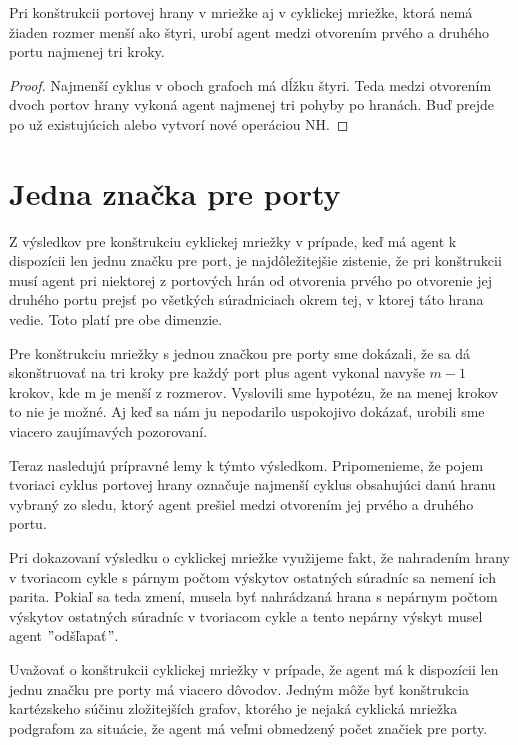 \begin{lem}
Pri konštrukcii portovej hrany v mriežke aj v cyklickej mriežke, ktorá
nemá žiaden rozmer menší ako štyri, 
urobí agent medzi otvorením prvého a druhého
portu najmenej tri kroky.
\end{lem}
\begin{proof}
Najmenší cyklus v oboch grafoch má dĺžku štyri. 
Teda medzi otvorením dvoch portov
hrany vykoná agent najmenej tri pohyby po hranách. Buď prejde po už
existujúcich alebo vytvorí nové operáciou NH.
\end{proof}

\section{Jedna značka pre porty}

Z výsledkov pre konštrukciu cyklickej mriežky v prípade, keď má agent k
dispozícii len jednu značku pre port, je najdôležitejšie zistenie, že pri
konštrukcii musí agent pri niektorej z portových hrán od otvorenia prvého po
otvorenie jej druhého portu prejsť po všetkých súradniciach okrem tej, v
ktorej táto hrana vedie. Toto platí pre obe dimenzie.

Pre konštrukciu mriežky s jednou značkou pre porty sme dokázali, že sa dá
skonštruovať na tri kroky pre každý port plus agent vykonal navyše $m-1$
krokov, kde m je menší z rozmerov. Vyslovili sme hypotézu, že na menej
krokov to nie je možné. Aj keď sa nám ju nepodarilo uspokojivo dokázať,
urobili sme viacero zaujímavých pozorovaní.

Teraz nasledujú prípravné lemy k týmto výsledkom. Pripomenieme, že pojem
tvoriaci cyklus portovej hrany označuje najmenší cyklus obsahujúci danú hranu
vybraný zo sledu, ktorý agent prešiel medzi otvorením jej prvého a druhého
portu.

Pri dokazovaní výsledku o cyklickej mriežke využijeme fakt, že nahradením
hrany v tvoriacom cykle s párnym počtom výskytov ostatných súradníc sa nemení 
ich parita. Pokiaľ sa teda zmení, musela byť nahrádzaná hrana s nepárnym
počtom výskytov ostatných súradníc v tvoriacom cykle a tento nepárny výskyt
musel agent $"$odšľapať$"$.

Uvažovať o konštrukcii cyklickej mriežky v prípade, že agent má k dispozícii
len jednu značku pre porty má viacero dôvodov. Jedným môže byť konštrukcia
kartézskeho súčinu zložitejších grafov, ktorého je nejaká cyklická mriežka
podgrafom za situácie, že agent má veľmi obmedzený počet značiek pre porty.

